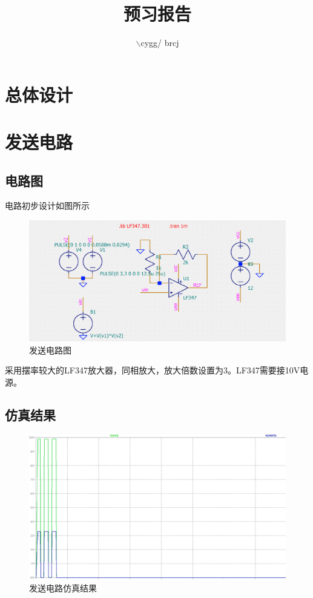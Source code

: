 \documentclass{article}
\title{预习报告}
\author{$\backslash$cygg/ brcj}
\begin{document}
\maketitle

\section{总体设计}

\section{发送电路}
\subsection{电路图}
电路初步设计如图所示
\begin{figure}[H]
    \centering
    \includegraphics[width = 12cm]{images/tx_cir.png}
    \caption{发送电路图}\label{fig1}
\end{figure}
采用摆率较大的LF347放大器，同相放大，放大倍数设置为3。LF347需要接10V电源。
\subsection{仿真结果}
\begin{figure}[H]
    \centering
    \includegraphics[width = 12cm]{images/tx_waveform.png}
    \caption{发送电路仿真结果}\label{fig2}
\end{figure}
\end{document}

